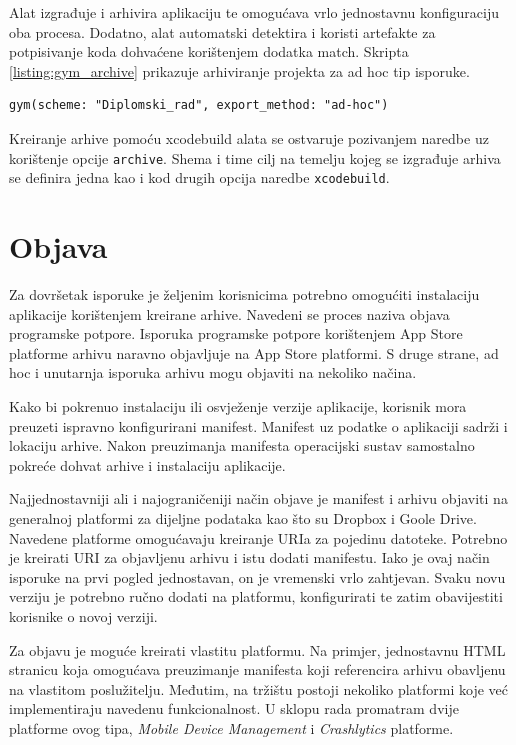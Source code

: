 \documentclass[times, utf8, diplomski, numeric]{fer}
\begin{document}
Alat izgrađuje i arhivira aplikaciju te omogućava vrlo jednostavnu konfiguraciju oba procesa. Dodatno, alat automatski detektira i koristi artefakte za potpisivanje koda dohvaćene korištenjem dodatka match. Skripta \ref{listing:gym_archive} prikazuje arhiviranje projekta za ad hoc tip isporuke.

\begin{lstlisting}[caption=Arhiviranje aplikacije za ad hoc isporuku pomoću dodatka gym, label=listing:gym_archive]
gym(scheme: "Diplomski_rad", export_method: "ad-hoc")
\end{lstlisting}

Kreiranje arhive pomoću xcodebuild alata se ostvaruje pozivanjem naredbe uz korištenje opcije \verb|archive|. Shema i time cilj na temelju kojeg se izgrađuje arhiva se definira jedna kao i kod drugih opcija naredbe \verb|xcodebuild|.


\section{Objava}

Za dovršetak isporuke je željenim korisnicima potrebno omogućiti instalaciju aplikacije korištenjem kreirane arhive. Navedeni se proces naziva objava programske potpore. Isporuka programske potpore korištenjem App Store platforme arhivu naravno objavljuje na App Store platformi. S druge strane, ad hoc i unutarnja isporuka arhivu mogu objaviti na nekoliko načina.

Kako bi pokrenuo instalaciju ili osvježenje verzije aplikacije, korisnik mora preuzeti ispravno konfigurirani manifest. Manifest uz podatke o aplikaciji sadrži i lokaciju arhive. Nakon preuzimanja manifesta operacijski sustav samostalno pokreće dohvat arhive i instalaciju aplikacije.

Najjednostavniji ali i najograničeniji način objave je manifest i arhivu objaviti na generalnoj platformi za dijeljne podataka kao što su Dropbox i Goole Drive. Navedene platforme omogućavaju kreiranje URIa za pojedinu datoteke. Potrebno je kreirati URI za objavljenu arhivu i istu dodati manifestu. Iako je ovaj način isporuke na prvi pogled jednostavan, on je vremenski vrlo zahtjevan. Svaku novu verziju je potrebno ručno dodati na platformu, konfigurirati te zatim obavijestiti korisnike o novoj verziji.

Za objavu je moguće kreirati vlastitu platformu. Na primjer, jednostavnu HTML stranicu koja omogućava preuzimanje manifesta koji referencira arhivu obavljenu na vlastitom poslužitelju. Međutim, na tržištu postoji nekoliko platformi koje već implementiraju navedenu funkcionalnost. U sklopu rada promatram dvije platforme ovog tipa, \textit{Mobile Device Management} i \textit{Crashlytics} platforme.
\end{document}
